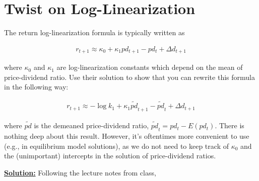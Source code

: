 \documentclass{article}
\begin{document}
\begin{enumerate}
\bigskip




\end{enumerate}

\pagebreak

\section{Twist on Log-Linearization}

The return log-linearization formula is typically written as

\begin{align}
r_{t+1} \approx \kappa_0 + \kappa_1 pd_{t+1} - pd_t + \Delta d_{t+1} \label{p3_ll1}
\end{align}

where $\kappa_0$ and $\kappa_1$ are log-linearization constants which depend on the mean of price-dividend ratio. Use their solution to show that you can rewrite this formula in the following way:

\begin{align}
r_{t+1} \approx - \log k_1 + \kappa_1 \tilde{pd}_{t+1} - \tilde{pd}_t + \Delta d_{t+1} \label{p3_ll2}
\end{align}

where $\tilde{pd}$ is the demeaned price-dividend ratio, $\tilde{pd}_t = pd_t - E(pd_t)$.  There is nothing deep about this result. However, it's oftentimes more convenient to use (e.g., in equilibrium model solutions), as we do not need to keep track of $\kappa_0$ and the (unimportant) intercepts in the solution of price-dividend ratios.

\bigskip

\textbf{\underline{Solution:}} Following the lecture notes from class,
\end{document}
